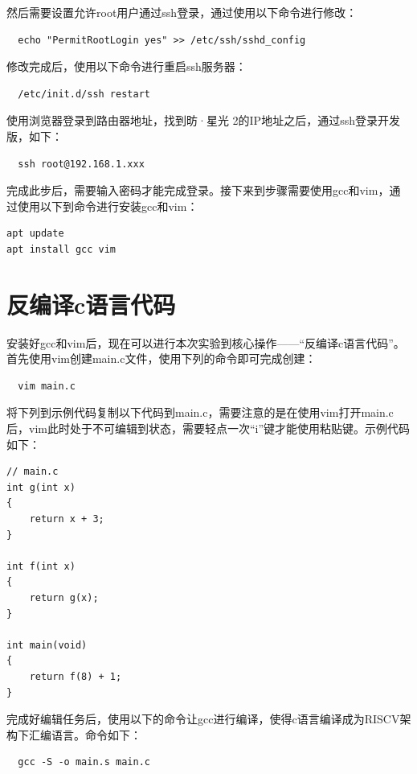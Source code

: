 \documentclass[lang=cn,10pt]{elegantbook}
\begin{document}
然后需要设置允许root用户通过ssh登录，通过使用以下命令进行修改：
\begin{lstlisting}
  echo "PermitRootLogin yes" >> /etc/ssh/sshd_config
\end{lstlisting}

修改完成后，使用以下命令进行重启ssh服务器：
\begin{lstlisting}
  /etc/init.d/ssh restart
\end{lstlisting}

使用浏览器登录到路由器地址，找到昉·星光 2的IP地址之后，通过ssh登录开发版，如下：

\begin{lstlisting}
  ssh root@192.168.1.xxx
\end{lstlisting}

完成此步后，需要输入密码才能完成登录。接下来到步骤需要使用gcc和vim，通过使用以下到命令进行安装gcc和vim：

\begin{lstlisting}
apt update
apt install gcc vim  
\end{lstlisting}

\section{反编译c语言代码}
安装好gcc和vim后，现在可以进行本次实验到核心操作——“反编译c语言代码”。首先使用vim创建main.c文件，使用下列的命令即可完成创建：
\begin{lstlisting}
  vim main.c  
\end{lstlisting}

将下列到示例代码复制以下代码到main.c，需要注意的是在使用vim打开main.c后，vim此时处于不可编辑到状态，需要轻点一次“i”键才能使用粘贴键。示例代码如下：

\begin{lstlisting}
// main.c
int g(int x)
{
    return x + 3;
}
    
int f(int x)
{
    return g(x);
}
    
int main(void)
{
    return f(8) + 1;
}  
\end{lstlisting}

完成好编辑任务后，使用以下的命令让gcc进行编译，使得c语言编译成为RISCV架构下汇编语言。命令如下：

\begin{lstlisting}
  gcc -S -o main.s main.c
\end{lstlisting}
\end{document}
